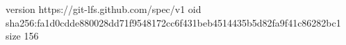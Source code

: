 version https://git-lfs.github.com/spec/v1
oid sha256:fa1d0cdde880028dd71f9548172cc6f431beb4514435b5d82fa9f41c86282bc1
size 156
